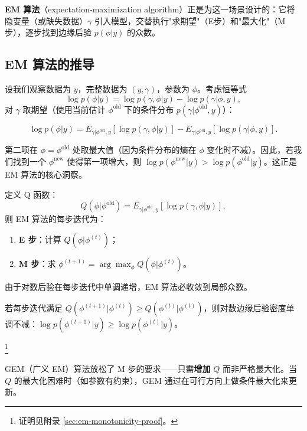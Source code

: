\textbf{EM 算法}（expectation-maximization algorithm）正是为这一场景设计的：它将隐变量（或缺失数据）$\gamma$ 引入模型，交替执行"求期望"（E步）和"最大化"（M步），逐步找到边缘后验 $p(\phi|y)$ 的众数。

\subsection{EM 算法的推导}\label{sec:em-derivation}

设我们观察数据为 $y$，完整数据为 $(y, \gamma)$，参数为 $\phi$。考虑恒等式
\[
\log p(\phi|y) = \log p(\gamma, \phi|y) - \log p(\gamma|\phi, y),
\]
对 $\gamma$ 取期望（使用当前估计 $\phi^{\text{old}}$ 下的条件分布 $p(\gamma|\phi^{\text{old}}, y)$）：

\[
\log p(\phi|y) = E_{\gamma|\phi^{\text{old}}, y}\!\left[ \log p(\gamma, \phi|y) \right] - E_{\gamma|\phi^{\text{old}}, y}\!\left[ \log p(\gamma|\phi, y) \right].
\label{eq:em-log-identity}
\]

第二项在 $\phi = \phi^{\text{old}}$ 处取最大值（因为条件分布的熵在 $\phi$ 变化时不减）。因此，若我们找到一个 $\phi^{\text{new}}$ 使得第一项增大，则 $\log p(\phi^{\text{new}}|y) > \log p(\phi^{\text{old}}|y)$。这正是 EM 算法的核心洞察。

定义 Q 函数：
\[
Q(\phi|\phi^{\text{old}}) = E_{\gamma|\phi^{\text{old}}, y}\!\left[ \log p(\gamma, \phi|y) \right],
\]
则 EM 算法的每步迭代为：
\begin{enumerate}
\item \textbf{E 步}：计算 $Q(\phi|\phi^{(t)})$；
\item \textbf{M 步}：求 $\phi^{(t+1)} = \arg\max_\phi Q(\phi|\phi^{(t)})$。
\end{enumerate}

由于对数后验在每步迭代中单调递增，EM 算法必收敛到局部众数。

\begin{Theorem}[EM 算法的单调性]\label{th:em-monotonicity}
若每步迭代满足 $Q(\phi^{(t+1)}|\phi^{(t)}) \geq Q(\phi^{(t)}|\phi^{(t)})$，则对数边缘后验密度单调不减：$\log p(\phi^{(t+1)}|y) \geq \log p(\phi^{(t)}|y)$。
\end{Theorem}\footnote{证明见附录 \cref{sec:em-monotonicity-proof}。}

GEM（广义 EM）算法放松了 M 步的要求——只需\textbf{增加} $Q$ 而非严格最大化。当 $Q$ 的最大化困难时（如参数有约束），GEM 通过在可行方向上做条件最大化来更新。

